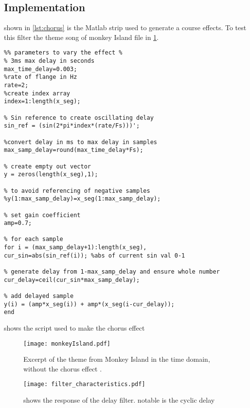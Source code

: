 
\subsection{Implementation}
shown in \ref{lst:chorus} is the Matlab strip used to generate a course effects.
To test this filter the theme song of monkey Island file in \ref{fig:monkeyIsland}.


\begin{listing}
	\begin{verbatim}
%% parameters to vary the effect %
% 3ms max delay in seconds
max_time_delay=0.003;
%rate of flange in Hz
rate=2;                         
%create index array
index=1:length(x_seg);

% Sin reference to create oscillating delay
sin_ref = (sin(2*pi*index*(rate/Fs)))';

%convert delay in ms to max delay in samples
max_samp_delay=round(max_time_delay*Fs);

% create empty out vector
y = zeros(length(x_seg),1);

% to avoid referencing of negative samples
%y(1:max_samp_delay)=x_seg(1:max_samp_delay);

% set gain coefficient
amp=0.7;

% for each sample
for i = (max_samp_delay+1):length(x_seg),
cur_sin=abs(sin_ref(i)); %abs of current sin val 0-1

% generate delay from 1-max_samp_delay and ensure whole number
cur_delay=ceil(cur_sin*max_samp_delay);

% add delayed sample
y(i) = (amp*x_seg(i)) + amp*(x_seg(i-cur_delay));
end
	\end{verbatim}
	\caption{shows the script used to make the chorus effect}
	\label{lst:chorus}
\end{listing}

\begin{figure}[!hbt]
	\centering
	\texttt{[image: monkeyIsland.pdf]}
	\caption{Excerpt of the theme from Monkey Island in the time domain, without the chorus effect .}
	\label{fig:monkeyIsland}
\end{figure}

\begin{figure}[!hbt]
	\centering
	\texttt{[image: filter\_characteristics.pdf]}
	\caption{shows the response of the delay filter. notable is the cyclic delay}
	\label{fig:responsecyclic}
\end{figure}
